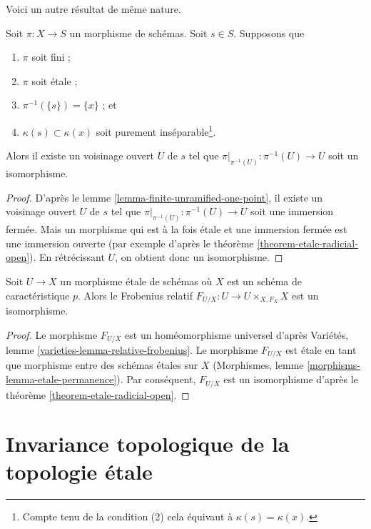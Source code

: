 \noindent
Voici un autre résultat de même nature.

\begin{lemma}
\label{lemma-finite-etale-one-point}
Soit $\pi : X \to S$ un morphisme de schémas. Soit $s \in S$.
Supposons que
\begin{enumerate}
\item $\pi$ soit fini ;
\item $\pi$ soit \'etale ;
\item $\pi^{-1}(\{s\}) = \{x\}$ ; et
\item $\kappa(s) \subset \kappa(x)$ soit purement
inséparable\footnote{Compte tenu de la condition (2)
cela équivaut à $\kappa(s) = \kappa(x)$.}.
\end{enumerate}
Alors il existe un voisinage ouvert $U$ de $s$ tel que
$\pi|_{\pi^{-1}(U)} : \pi^{-1}(U) \to U$ soit un isomorphisme.
\end{lemma}

\begin{proof}
D'après le
lemme \ref{lemma-finite-unramified-one-point},
il existe un voisinage ouvert $U$ de $s$ tel que
$\pi|_{\pi^{-1}(U)} : \pi^{-1}(U) \to U$ soit une immersion fermée.
Mais un morphisme qui est à la fois \'etale et une immersion fermée est une
immersion ouverte (par exemple d'après le
théorème \ref{theorem-etale-radicial-open}).
En rétrécissant $U$, on obtient donc un isomorphisme.
\end{proof}

\begin{lemma}
\label{lemma-relative-frobenius-etale}
Soit $U \to X$ un morphisme \'etale de schémas
où $X$ est un schéma de caractéristique $p$.
Alors le Frobenius relatif $F_{U/X} : U \to U \times_{X, F_X} X$
est un isomorphisme.
\end{lemma}

\begin{proof}
Le morphisme $F_{U/X}$ est un homéomorphisme universel d'après
Variétés, lemme \ref{varieties-lemma-relative-frobenius}.
Le morphisme $F_{U/X}$ est \'etale en tant que
morphisme entre des schémas \'etales sur $X$
(Morphismes, lemme \ref{morphisms-lemma-etale-permanence}).
Par conséquent, $F_{U/X}$ est un isomorphisme d'après le
théorème \ref{theorem-etale-radicial-open}.
\end{proof}






\section{Invariance topologique de la topologie \'etale}
\label{section-topological-invariance}

